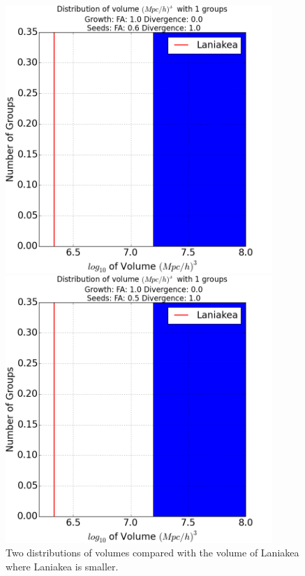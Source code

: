 \documentclass[12pt]{article}
\begin{document}
\begin{figure}[ht]
\centering
\begin{minipage}{.5\textwidth}
  \centering
  \includegraphics[width=0.9\textwidth]{groups/volumeplots/volumes_distr_Mpc_laniakea_06_Trace_10_search_FA_10_Trace_00.png} %
\end{minipage}%
\begin{minipage}{.5\textwidth}
  \centering
  \includegraphics[width=0.9\textwidth]{groups/volumeplots/volumes_distr_Mpc_laniakea_05_Trace_10_search_FA_10_Trace_00.png}
\end{minipage}
\label{fg:compare_lan_small}
\caption{Two distributions of volumes compared with the volume of Laniakea where Laniakea is smaller.}
\end{figure}
\FloatBarrier
\end{document}
